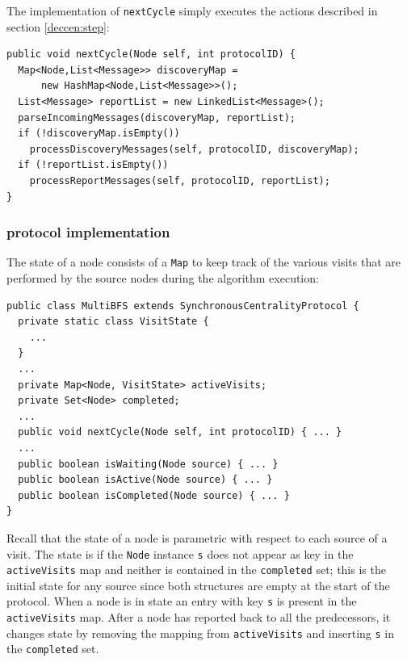 The implementation of \texttt{nextCycle} simply executes the actions described in section \ref{deccen:step}:
\begin{verbatim}
public void nextCycle(Node self, int protocolID) {
  Map<Node,List<Message>> discoveryMap =
      new HashMap<Node,List<Message>>();
  List<Message> reportList = new LinkedList<Message>();
  parseIncomingMessages(discoveryMap, reportList);
  if (!discoveryMap.isEmpty())
    processDiscoveryMessages(self, protocolID, discoveryMap);
  if (!reportList.isEmpty())
    processReportMessages(self, protocolID, reportList);
}
\end{verbatim}

\subsubsection{\multibfs{} protocol implementation}

The state of a \multibfs{} node consists of a \texttt{Map} to keep track of the various visits that are performed by the source nodes during the algorithm execution:

\begin{verbatim}
public class MultiBFS extends SynchronousCentralityProtocol {
  private static class VisitState {
    ...
  }
  ...
  private Map<Node, VisitState> activeVisits;
  private Set<Node> completed;
  ...
  public void nextCycle(Node self, int protocolID) { ... }
  ...
  public boolean isWaiting(Node source) { ... }
  public boolean isActive(Node source) { ... }
  public boolean isCompleted(Node source) { ... }
}
\end{verbatim}
Recall that the state of a node is parametric with respect to each source of a visit. The state is  if the \texttt{Node} instance \texttt{s} does not appear as key in the \texttt{activeVisits} map and neither is contained in the \texttt{completed} set; this is the initial state for any source since both structures are empty at the start of the protocol. When a node is in state  an entry with key \texttt{s} is present in the \texttt{activeVisits} map. After a node has reported back to all the predecessors, it changes state  by removing the mapping from \texttt{activeVisits} and inserting \texttt{s} in the \texttt{completed} set.

